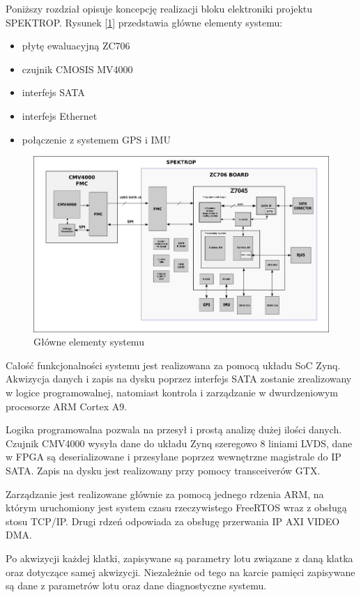 \documentclass[a4paper,11pt,oneside]{book}  %
\begin{document}
Poniższy rozdział opisuje koncepcję realizacji bloku elektroniki projektu SPEKTROP. Rysunek [\ref{fig:OVER}] przedstawia główne elementy systemu: 
\begin{itemize}
	\item płytę ewaluacyjną ZC706
	\item czujnik CMOSIS MV4000
	\item interfejs SATA
	\item interfejs Ethernet
	\item połączenie z systemem GPS i IMU
\end{itemize}
\begin{figure}[!h]
	\centering
	\includegraphics[width=16cm]{systembnw2.png}
	\caption{Główne elementy systemu}
	\label{fig:OVER}
\end{figure}

Całość funkcjonalności systemu jest realizowana za pomocą układu SoC Zynq. Akwizycja danych i zapis na dysku poprzez interfejs SATA zostanie zrealizowany w logice programowalnej, natomiast kontrola i zarządzanie w dwurdzeniowym procesorze ARM Cortex A9. 

Logika programowalna pozwala na przesył i prostą analizę dużej ilości danych. Czujnik CMV4000 wysyła dane do układu Zynq szeregowo 8 liniami LVDS, dane w FPGA są deserializowane i przesyłane poprzez wewnętrzne magistrale do IP SATA. Zapis na dysku jest realizowany przy pomocy transceiverów GTX.


Zarządzanie jest realizowane głównie za pomocą jednego rdzenia ARM, na którym uruchomiony jest system czasu rzeczywistego FreeRTOS wraz z obsługą stosu TCP/IP. Drugi rdzeń odpowiada za obsługę przerwania IP AXI VIDEO DMA.

Po akwizycji każdej klatki, zapisywane są parametry lotu związane z daną klatka oraz dotyczące samej akwizycji. Niezależnie od tego na karcie pamięci zapisywane są dane z parametrów lotu oraz dane diagnostyczne systemu. 
\end{document}
